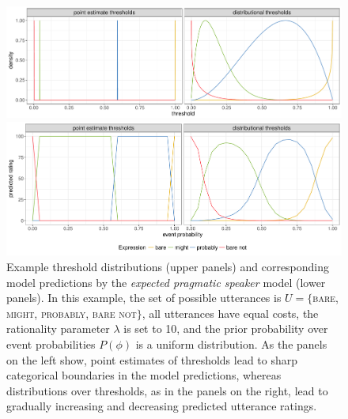 \documentclass[man, floatsintext]{apa6}
\begin{document}
\begin{figure}[th!]
\includegraphics[width=\textwidth]{plots/model-visualization-distributions.pdf}

\includegraphics[width=\textwidth]{plots/model-visualization-predictions.pdf}

\caption{Example threshold distributions (upper panels) and corresponding model predictions by the \textit{expected pragmatic speaker} model (lower panels). In this example, the set of possible utterances is $U=\{$\textsc{bare}, \textsc{might}, \textsc{probably}, \textsc{bare not}$\}$, all utterances have equal costs, the rationality parameter $\lambda$ is set to 10, and the prior probability over event probabilities $P(\phi)$ is a uniform distribution. As the panels on the left show, point estimates of thresholds lead to sharp categorical boundaries in the model predictions, whereas distributions over thresholds, as in the panels on the right, lead to gradually increasing and decreasing predicted utterance ratings. \label{fig:model-visualization}}
\end{figure}
\end{document}
